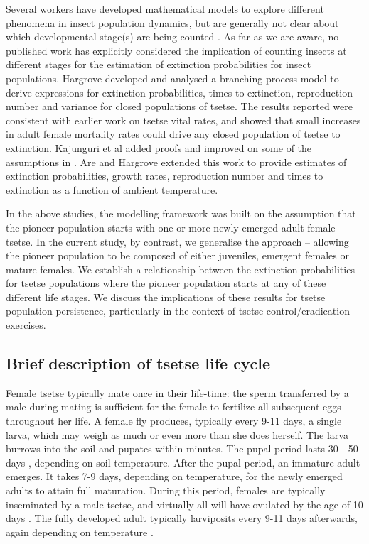 \documentclass[smallextended]{svjour3}
\begin{document}
	Several workers have developed mathematical models to explore different phenomena in insect population dynamics, but are generally not clear about which developmental stage(s) are being counted \cite{Ylioja1999,Artzrouni2003,Hargrove2005a,Adams2005,Barclay2011d,Peck2012a,Lin2015,Kajunguri2019}.  As far as we are aware, no published work has explicitly considered the implication of counting insects at different stages for the estimation of extinction probabilities for insect populations. Hargrove \cite{Hargrove2005a} developed and analysed a branching process model to derive expressions for extinction probabilities, times to extinction, reproduction number and variance for closed populations of tsetse. The results reported were consistent with earlier work \cite{hargrove1988tsetse} on tsetse vital rates, and showed that small increases in adult female mortality rates could drive any closed population of tsetse to extinction. Kajunguri et al \cite{Kajunguri2019} added proofs and improved on some of the assumptions in \cite{Hargrove2005a}. Are and Hargrove \cite{Are2019} extended this work to provide estimates of extinction probabilities, growth rates, reproduction number and times to extinction as a function of ambient temperature. 
	
	In the above studies, the modelling framework was built on the assumption that the pioneer population starts with one or more newly emerged adult female tsetse. In the current study, by contrast, we  generalise the approach – allowing the pioneer population to be composed of  either juveniles, emergent females or mature females. We establish a relationship between the extinction probabilities for tsetse populations where the pioneer population starts at any of these different life stages. We discuss the implications of these results for tsetse population persistence, particularly in the context of tsetse control/eradication exercises. 
	
	\subsection{Brief description of tsetse life cycle}
	Female tsetse typically mate once in their life-time: the sperm transferred by a male during mating is sufficient for the female to fertilize all subsequent eggs throughout her life. A female fly produces, typically every 9-11 days, a single larva, which may weigh as much or even more than she does herself.  The larva burrows into the soil and pupates within minutes. The pupal period lasts 30 - 50 days \cite{PhelpsR.J.&Burrows}, depending on soil temperature. After the pupal period, an immature adult emerges. It takes 7-9 days, depending on temperature, for the newly emerged adults to attain full maturation. During this period, females are typically inseminated by a male tsetse, and virtually all will have ovulated by the age of 10 days \cite{Hargrove2012c}. The fully developed adult typically larviposits every 9-11 days afterwards, again depending on temperature \cite{Hargrove2019}. 
	
\end{document}
